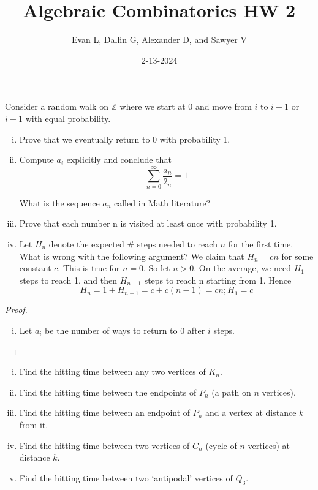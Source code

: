 \documentclass[11pt]{scrartcl}
\title{Algebraic Combinatorics HW 2}
\author{Evan L, Dallin G, Alexander D, and Sawyer V}
\date{2-13-2024}
\begin{document}
\maketitle
\setcounter{section}{1}
\begin{problem}
    Consider a random walk on $\mathbb{Z}$ where we start at 0 and move from $i$ to $i + 1$ or $i - 1$ with equal probability.

    \begin{enumerate}[(i)]
        \item Prove that we eventually return to 0 with probability 1.
        \item Compute $a_i$ explicitly and conclude that
        \[
            \sum_{n=0}^{\infty} \frac{a_n}{2_n} = 1
        \]

        What is the sequence ${a_n}$ called in Math literature?
        \item Prove that each number n is visited at least once with probability 1.
        \item Let $H_n$ denote the expected \# steps needed to reach $n$ for the first time. What is wrong with the
        following argument?
        We claim that $H_n = cn$ for some constant $c$. This is true for $n = 0$. So let $n > 0$. On the average, we need $H_1$ steps to reach 1, and then $H_{n-1}$ steps to reach n starting from 1. Hence
        \[
            H_n = 1 + H_{n-1} = c + c(n-1) = cn ; H_1 = c
        \]
    \end{enumerate}
\end{problem}
\begin{proof}
    \begin{enumerate}[(i)]
        \item Let $a_i$ be the number of ways to return to $0$ after $i$ steps.
    \end{enumerate}
\end{proof}
\begin{problem}[\textcolor{red}{Some examples of Hitting times}]
    \begin{enumerate}[(i)]
        \item Find the hitting time between any two vertices of $K_n$.
        \item Find the hitting time between the endpoints of $P_n$ (a path on $n$ vertices).
        \item Find the hitting time between an endpoint of $P_n$ and a vertex at distance $k$ from it.
        \item Find the hitting time between two vertices of $C_n$ (cycle of $n$ vertices) at distance $k$.
        \item Find the hitting time between two `antipodal' vertices of $Q_3$.
    \end{enumerate}
\end{problem}
\end{document}
